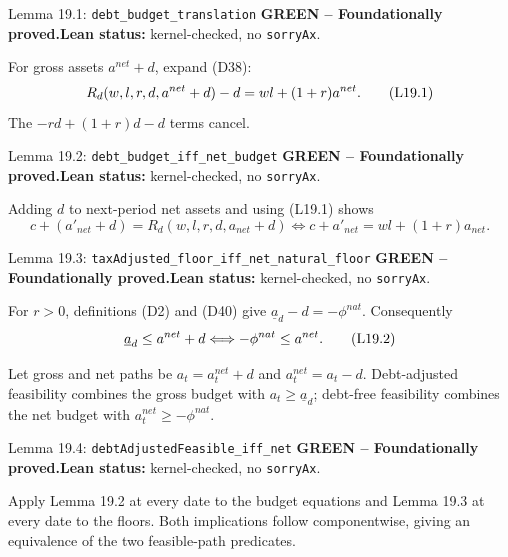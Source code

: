 \documentclass[11pt]{article}
\newcommand{\leanname}[1]{\nolinkurl{#1}}
\newcommand{\eqL}[1]{\refstepcounter{equation}\tag{L#1}}
\newcommand{\formalcheck}{\textbf{Lean status:} kernel-checked, no \texttt{sorryAx}.}
\newcommand{\greenstatus}{\textcolor{proved}{\textbf{GREEN -- Foundationally proved.}}}
\begin{document}
\begin{greenbox}{Lemma 19.1: \leanname{debt_budget_translation}}
\greenstatus\quad\formalcheck

For gross assets \(a^{net}+d\), expand (D38):
\begin{equation}
 R_d(w,l,r,d,a^{net}+d)-d=wl+(1+r)a^{net}. \eqL{19.1}\label{L19.1}
\end{equation}
The \(-rd+(1+r)d-d\) terms cancel.
\end{greenbox}

\begin{greenbox}{Lemma 19.2: \leanname{debt_budget_iff_net_budget}}
\greenstatus\quad\formalcheck

Adding \(d\) to next-period net assets and using (L19.1) shows
\[
 c+(a'_{net}+d)=R_d(w,l,r,d,a_{net}+d)
 \Longleftrightarrow c+a'_{net}=wl+(1+r)a_{net}.
\]
\end{greenbox}

\begin{greenbox}{Lemma 19.3: \leanname{taxAdjusted_floor_iff_net_natural_floor}}
\greenstatus\quad\formalcheck

For \(r>0\), definitions (D2) and (D40) give
\(\underline a_d-d=-\phi^{nat}\).  Consequently
\begin{equation}
 \underline a_d\le a^{net}+d\Longleftrightarrow
 -\phi^{nat}\le a^{net}. \eqL{19.2}\label{L19.2}
\end{equation}
\end{greenbox}

Let gross and net paths be \(a_t=a_t^{net}+d\) and
\(a_t^{net}=a_t-d\).  Debt-adjusted feasibility combines the gross budget
with \(a_t\ge\underline a_d\); debt-free feasibility combines the net budget
with \(a_t^{net}\ge-\phi^{nat}\).

\begin{greenbox}{Lemma 19.4: \leanname{debtAdjustedFeasible_iff_net}}
\greenstatus\quad\formalcheck

Apply Lemma 19.2 at every date to the budget equations and Lemma 19.3 at every
date to the floors.  Both implications follow componentwise, giving an
equivalence of the two feasible-path predicates.
\end{greenbox}
\end{document}
